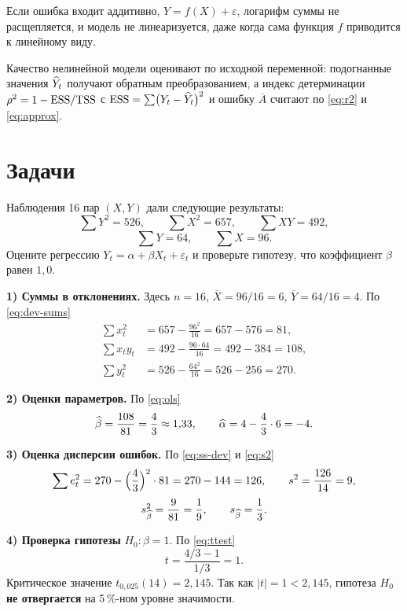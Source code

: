 Если ошибка входит аддитивно, $Y = f(X) + \varepsilon$, логарифм суммы не
расщепляется, и модель не линеаризуется, даже когда сама функция $f$ приводится
к линейному виду.

Качество нелинейной модели оценивают по исходной переменной: подогнанные
значения $\widehat{Y}_t$ получают обратным преобразованием, а индекс детерминации
$\rho^2 = 1 - \mathrm{ESS}/\mathrm{TSS}$ с $\mathrm{ESS} = \sum\bigl(Y_t - \widehat{Y}_t\bigr)^2$ и ошибку
$\overline{A}$ считают по \eqref{eq:r2} и \eqref{eq:approx}.
\fi

\section{Задачи}


Наблюдения 16 пар $(X,Y)$ дали следующие результаты:
\[
  \textstyle\sum Y^2 = 526, \qquad \sum X^2 = 657, \qquad \sum XY = 492,
\]
\[
  \textstyle\sum Y = 64, \qquad \sum X = 96 .
\]
Оцените регрессию $Y_t = \alpha + \beta X_t + \varepsilon_t$ и проверьте
гипотезу, что коэффициент $\beta$ равен $1{,}0$.

\begin{solution}
\textbf{1) Суммы в отклонениях.} Здесь $n = 16$, $\overline{X} = 96/16 = 6$,
$\overline{Y} = 64/16 = 4$. По \eqref{eq:dev-sums}
\[
\begin{aligned}
  \sum x_t^2  &= 657 - \frac{96^2}{16} = 657 - 576 = 81, \\[2pt]
  \sum x_ty_t &= 492 - \frac{96\cdot 64}{16} = 492 - 384 = 108, \\[2pt]
  \sum y_t^2  &= 526 - \frac{64^2}{16} = 526 - 256 = 270 .
\end{aligned}
\]

\medskip
\textbf{2) Оценки параметров.} По \eqref{eq:ols}
\[
  \widehat{\beta} = \frac{108}{81} = \frac{4}{3} \approx 1{,}33,
  \qquad
  \widehat{\alpha} = 4 - \frac{4}{3}\cdot 6 = -4 .
\]

\medskip
\textbf{3) Оценка дисперсии ошибок.} По \eqref{eq:ss-dev} и \eqref{eq:s2}
\[
  \sum e_t^2 = 270 - \Bigl(\frac{4}{3}\Bigr)^2\cdot 81 = 270 - 144 = 126,
  \qquad
  s^2 = \frac{126}{14} = 9,
\]
\[
  s_{\widehat{\beta}}^2 = \frac{9}{81} = \frac{1}{9},
  \qquad
  s_{\widehat{\beta}} = \frac{1}{3}.
\]

\medskip
\textbf{4) Проверка гипотезы} $H_0\colon \beta = 1$. По \eqref{eq:ttest}
\[
  t = \frac{4/3 - 1}{1/3} = 1 .
\]
Критическое значение $t_{0{,}025}(14) = 2{,}145$. Так как $|t| = 1 < 2{,}145$,
гипотеза $H_0$ \textbf{не отвергается} на 5\,\%-ном уровне значимости.
\end{solution}

